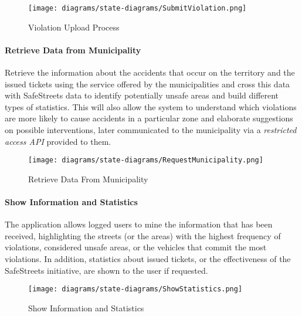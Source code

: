 \clearpage

	\begin{figure}[h]
		\centering
		\texttt{[image: diagrams/state-diagrams/SubmitViolation.png]}
		\caption{
			\label{fig:violationUpload} Violation Upload Process
		}
	\end{figure}
	
\paragraph{Retrieve Data from Municipality}
Retrieve the information about the accidents that occur on the territory and the issued tickets using the service offered by the municipalities and cross this data with SafeStreets data to identify potentially unsafe areas and build different types of statistics. This will also allow the system to understand which violations are more likely to cause accidents in a particular zone and elaborate suggestions on possible interventions, later communicated to the municipality via a \emph{restricted access API} provided to them. \cite{Assignments} \newline

	\begin{figure}[h]
		\centering
		\texttt{[image: diagrams/state-diagrams/RequestMunicipality.png]}
		\caption{
			\label{fig:retrieveMunicipality} Retrieve Data From Municipality}
	\end{figure}
	
\clearpage

\paragraph{Show Information and Statistics}
The application allows logged users to mine the information that has been received, highlighting the streets (or the areas) with the highest frequency of violations, considered unsafe areas, or the vehicles that commit the most violations. In addition, statistics about issued tickets, or the effectiveness of the SafeStreets initiative, are shown to the user if requested. \cite{Assignments} \newline
	\begin{figure}[h]
		\centering
		\texttt{[image: diagrams/state-diagrams/ShowStatistics.png]}
		\caption{
			\label{fig:showStatistics} Show Information and Statistics
			}
	\end{figure}
	
